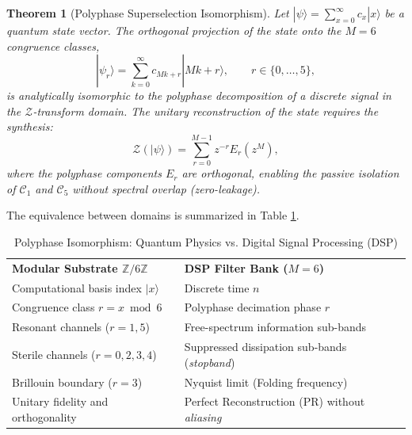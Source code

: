\documentclass[reprint,aps,pra,superscriptaddress,nofootinbib]{revtex4-2}
\theoremstyle{plain}
\newtheorem{theorem}{Theorem}[section]
\theoremstyle{definition}
\theoremstyle{remark}
\begin{document}
\begin{theorem}[Polyphase Superselection Isomorphism]
Let $|\psi\rangle = \sum_{x=0}^{\infty} c_x |x\rangle$ be a quantum state vector. The orthogonal projection of the state onto the $M=6$ congruence classes,
\begin{equation}
|\psi_r\rangle = \sum_{k=0}^{\infty} c_{Mk + r} |Mk+r\rangle, \qquad r \in \{0,\dots,5\},
\end{equation}
is analytically isomorphic to the polyphase decomposition of a discrete signal in the $\mathcal{Z}$-transform domain. The unitary reconstruction of the state requires the synthesis:
\begin{equation}
\mathcal{Z}(|\psi\rangle) = \sum_{r=0}^{M-1} z^{-r} E_r(z^M),
\end{equation}
where the polyphase components $E_r$ are orthogonal, enabling the passive isolation of $\mathcal{C}_1$ and $\mathcal{C}_5$ without spectral overlap (\textit{zero-leakage}).
\end{theorem}

The equivalence between domains is summarized in Table \ref{tab:isomorfismo}.

\begin{table}[htbp]
\caption{Polyphase Isomorphism: Quantum Physics vs. Digital Signal Processing (DSP)}
\label{tab:isomorfismo}
\begin{ruledtabular}
\begin{tabular}{ll}
\textbf{Modular Substrate $\mathbb{Z}/6\mathbb{Z}$} & \textbf{DSP Filter Bank ($M=6$)} \\
\colrule
Computational basis index $|x\rangle$ & Discrete time $n$ \\
Congruence class $r = x \bmod 6$ & Polyphase decimation phase $r$ \\
Resonant channels ($r=1,5$) & Free-spectrum information sub-bands \\
Sterile channels ($r=0,2,3,4$) & Suppressed dissipation sub-bands (\textit{stopband}) \\
Brillouin boundary ($r=3$) & Nyquist limit (Folding frequency) \\
Unitary fidelity and orthogonality & Perfect Reconstruction (PR) without \textit{aliasing} \\
\end{tabular}
\end{ruledtabular}
\end{table}
\end{document}
